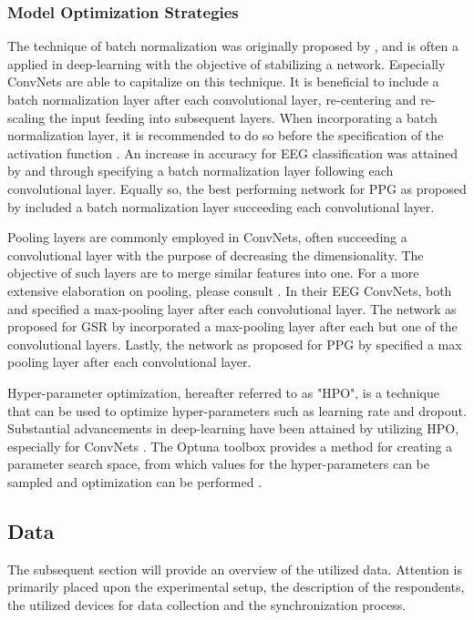 \documentclass[12pt]{article}
\begin{document}
\subsubsection{Model Optimization Strategies}
The technique of batch normalization was originally proposed by , and is often a applied in deep-learning with the objective of stabilizing a network. Especially ConvNets are able to capitalize on this technique. It is beneficial to include a batch normalization layer after each convolutional layer, re-centering and re-scaling the input feeding into subsequent layers. When incorporating a batch normalization layer, it is recommended to do so before the specification of the activation function \cite{ioffe2015batch}. An increase in accuracy for EEG classification was attained by  and  through specifying a batch normalization layer following each convolutional layer. Equally so, the best performing network for PPG as proposed by  included a batch normalization layer succeeding each convolutional layer. 

Pooling layers are commonly employed in ConvNets, often succeeding a convolutional layer with the purpose of decreasing the dimensionality. The objective of such layers are to merge similar features into one. For a more extensive elaboration on pooling, please consult . In their EEG ConvNets, both  and  specified a max-pooling layer after each convolutional layer. The network as proposed for GSR by  incorporated a max-pooling layer after each but one of the convolutional layers. Lastly, the network as proposed for PPG by \cite{biswas2019cornet} specified a max pooling layer after each convolutional layer. 

Hyper-parameter optimization, hereafter referred to as "HPO", is a technique that can be used to optimize hyper-parameters such as learning rate and dropout. Substantial advancements in deep-learning have been attained by utilizing HPO, especially for ConvNets \cite{bergstra2012random}. The Optuna toolbox provides a method for creating a parameter search space, from which values for the hyper-parameters can be sampled and optimization can be performed \cite{akiba2019optuna}. 
\bigskip 

\subsection{Data}
The subsequent section will provide an overview of the utilized data. Attention is primarily placed upon the experimental setup, the description of the respondents, the utilized devices for data collection and the synchronization process. 
\end{document}
